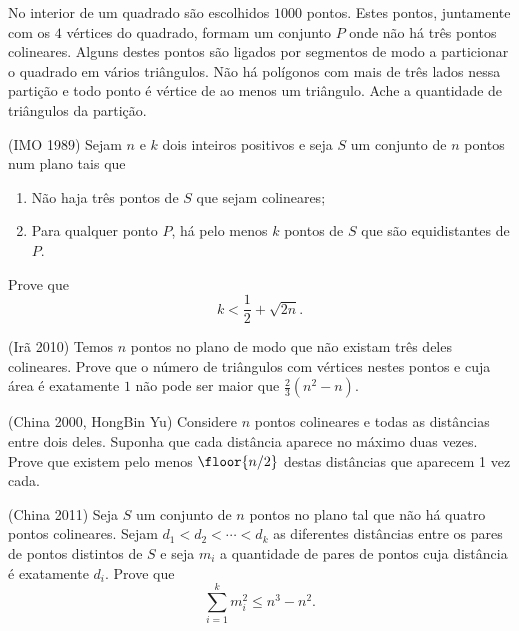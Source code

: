 \documentclass[10pt,a4paper]{article}
\begin{document}
	\begin{prob}
		No interior de um quadrado são escolhidos $1000$ pontos. Estes pontos, juntamente com os $4$ vértices do quadrado, formam um conjunto $P$ onde não há três pontos colineares. Alguns destes pontos são ligados por segmentos de modo a particionar o quadrado em vários triângulos. Não há polígonos com mais de três lados nessa partição e todo ponto é vértice de ao menos um triângulo. Ache a quantidade de triângulos da partição.
	\end{prob}
	\begin{prob}(IMO 1989)
		Sejam $n$ e $k$ dois inteiros positivos e seja $S$ um conjunto de $n$ pontos num plano tais que
		\begin{enumerate}[label = (\roman*)]
			\item Não haja três pontos de $S$ que sejam colineares;
			\item Para qualquer ponto $P$, há pelo menos $k$ pontos de $S$ que são equidistantes de $P$.
		\end{enumerate}

		Prove que $$k < \frac{1}{2} + \sqrt{2n}.$$
	\end{prob}
	\begin{prob}(Irã 2010)
		Temos $n$ pontos no plano de modo que não existam três deles colineares. Prove que o número de triângulos com vértices nestes pontos e cuja área é exatamente $1$ não pode ser maior que $\frac{2}{3}(n^2 - n)$.
	\end{prob}
	\begin{prob}(China 2000, HongBin Yu)
		Considere $n$ pontos colineares e todas as distâncias entre dois deles. Suponha que cada distância aparece no máximo duas vezes. Prove que existem pelo menos $\floor{n/2}$ destas distâncias que aparecem 1 vez cada.
	\end{prob}
	\begin{prob}(China 2011)
		Seja $S$ um conjunto de $n$ pontos no plano tal que não há quatro pontos colineares. Sejam $d_1 < d_2 < \cdots < d_k$ as diferentes distâncias entre os pares de pontos distintos de $S$ e seja $m_i$ a quantidade de pares de pontos cuja distância é exatamente $d_i$. Prove que $$\sum_{i = 1}^{k} m_i^2 \le n^3 - n^2.$$
	\end{prob}
\end{document}
